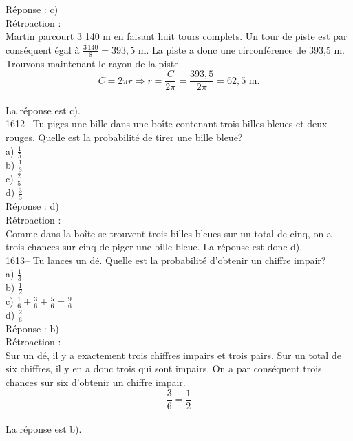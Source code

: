 R\'eponse : c)\\

R\'etroaction :\\
Martin parcourt 3 140 m en faisant huit tours complets. Un tour de
piste est par cons\'equent \'egal \`a
$\frac{3\,140}{8}=393,5{\textrm{ m.}}$ La piste a donc une
circonf\'erence de 393,5 m. Trouvons maintenant le rayon de la
piste. $$C=2\pi r\Rightarrow
r=\frac{C}{2\pi}=\frac{393,5}{2\pi}=62,5{\textrm{ m.}}$$\\
La r\'eponse est c).\\

1612-- Tu piges une bille dans une bo\^ite contenant trois billes
bleues et deux rouges. Quelle est la probabilit\'e de tirer une bille
bleue?\\
a) $\frac{1}{5}$\\[3mm]
b) $\frac{1}{3}$\\[3mm]
c) $\frac{2}{5}$\\[3mm]
d) $\frac{3}{5}$\\[3mm]

R\'eponse : d)\\

R\'etroaction :\\
Comme dans la  bo\^ite se trouvent trois billes bleues sur un total
de cinq, on a trois chances sur cinq de piger une bille bleue. La r\'eponse
est donc d).\\

1613-- Tu lances un d\'e. Quelle est la probabilit\'e d'obtenir un
chiffre impair?\\
a) $\frac{1}{3}$\\[3mm]
b) $\frac{1}{2}$\\[3mm]
c) $\frac{1}{6}+ \frac{3}{6}+ \frac{5}{6}= \frac{9}{6}$\\[3mm]
d) $\frac{2}{6}$\\[3mm]

R\'eponse : b)\\

R\'etroaction :\\
Sur un d\'e, il y a exactement trois chiffres impairs et trois
pairs. Sur un total de six chiffres, il y en a donc trois qui sont
impairs. On a par cons\'equent trois chances sur six d'obtenir un
chiffre impair.
$$\frac{3}{6}=\frac{1}{2}$$\\
La r\'eponse est b). \vskip 35pt





